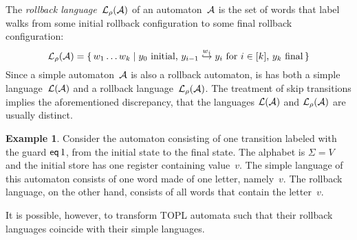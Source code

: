 \documentclass[9pt, preprint]{sigplanconf} %
\theoremstyle{definition}
\newtheorem{example}{Example}
\theoremstyle{remark}
\begin{document}
The \emph{rollback language}~${\cal L}_\rho({\cal A})$ of an automaton~${\cal A}$ is the set of words that label walks from some initial rollback configuration to some final rollback configuration:
\[
{\cal L}_\rho({\cal A})=
  \{\,w_1\ldots w_k\mid
    \text{$y_0$~initial,
    $y_{i-1}\stackrel{w_i}\hookrightarrow y_i$ for $i\in[k]$,
    $y_k$~final}\,\}
\]
Since a simple automaton~${\cal A}$ is also a rollback automaton, is has both a simple language~${\cal L}({\cal A})$ and a rollback language~${\cal L}_\rho({\cal A})$.
The treatment of skip transitions implies the aforementioned
discrepancy, that the languages ${\cal L}({\cal A})$ and ${\cal L}_\rho({\cal A})$ are usually distinct.

\begin{example}
Consider the automaton consisting of one transition labeled with the guard ${\sf eq}\,1$, from the initial state to the final state.
The alphabet is $\Sigma=V$ and the initial store has one register containing value~$v$.
The simple language of this automaton consists of one word made of one letter, namely~$v$.
The rollback language, on the other hand, consists of all words that contain the letter~$v$.
\end{example}

It is possible, however, to transform TOPL automata such that their rollback languages coincide with their simple languages.
\end{document}

